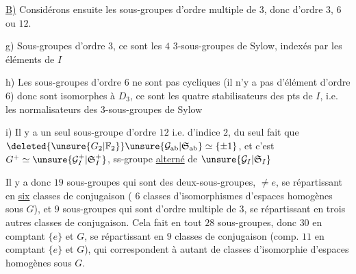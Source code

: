 \uline{B)} Considérons ensuite les sous-groupes  d'ordre multiple de $3$, donc d'ordre $3$, $6$ ou $12$.

g) Sous-groupes d'ordre $3$, ce sont les $4$ $3$-sous-groupes de Sylow, indexés par les éléments de $I$

h) Les sous-groupes d'ordre $6$ ne sont pas cycliques (il n'y a pas d'élément d'ordre $6$) donc sont isomorphes à $D_3$,  ce sont les quatre stabilisateurs des pts de $I$, i.e. les normalisateurs des $3$-sous-groupes de Sylow

i) Il y a un seul sous-groupe d'ordre $12$ i.e. d'indice $2$, du seul fait que $\deleted{\unsure{G_2|\mathbb{F}_2}}\unsure{\mathcal{G}_{\mathrm{ab}}|\mathfrak{S}_{\mathrm{ab}}}\simeq\{\pm1\}$, et c'est $G^+\simeq\unsure{\mathcal{G}_I^+|\mathfrak{S}_I^+}$, ss-groupe \uline{alterné} de $\unsure{\mathcal{G}_I|\mathfrak{S}_I}$

Il y a donc  $19$ sous-groupes qui sont des deux-sous-groupes, $\ne e$, se répartissant en \uline{six} classes de conjugaison ( $6$ classes d'isomorphismes d'espaces homogènes sous $G$), et $9$ sous-groupes  qui sont d'ordre multiple de $3$, se répartissant en trois autres classes de conjugaison. Cela fait en tout $28$ sous-groupes, donc $30$ en comptant $\{e\}$ et $G$, se répartissant en $9$ classes de conjugaison (comp. $11$ en comptant $\{e\}$ et $G$), qui correspondent à autant de classes d'isomorphie d'espaces homogènes sous $G$.
